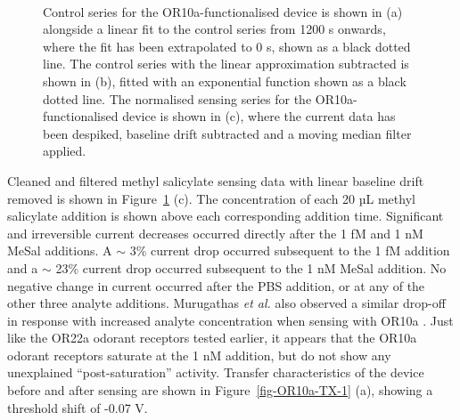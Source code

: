 \documentclass[
  a4paper,
]{scrbook}
\begin{document}
\begin{figure}
\begin{minipage}[t]{0.70\linewidth}
{{}

}

\end{minipage}%
%
\begin{minipage}[t]{0.15\linewidth}

{\centering 

~

}

\end{minipage}%

\caption[Control series for the OR10a-functionalised device alongside a
linear fitted curve, the control series with linear fit subtracted and
fitted with an exponential curve, and the normalised and filtered
sensing series for the OR10a-functionalised
device.]{\label{fig-OR10a-sensing}Control series for the
OR10a-functionalised device is shown in (a) alongside a linear fit to
the control series from 1200 s onwards, where the fit has been
extrapolated to 0 s, shown as a black dotted line. The control series
with the linear approximation subtracted is shown in (b), fitted with an
exponential function shown as a black dotted line. The normalised
sensing series for the OR10a-functionalised device is shown in (c),
where the current data has been despiked, baseline drift subtracted and
a moving median filter applied.}

\end{figure}

Cleaned and filtered methyl salicylate sensing data with linear baseline
drift removed is shown in Figure~\ref{fig-OR10a-sensing} (c). The
concentration of each 20 µL methyl salicylate addition is shown above
each corresponding addition time. Significant and irreversible current
decreases occurred directly after the 1 fM and 1 nM MeSal additions. A
\(\sim\) 3\% current drop occurred subsequent to the 1 fM addition and a
\(\sim\) 23\% current drop occurred subsequent to the 1 nM MeSal
addition. No negative change in current occurred after the PBS addition,
or at any of the other three analyte additions. Murugathas \emph{et al.}
also observed a similar drop-off in response with increased analyte
concentration when sensing with OR10a \autocite{Murugathas2019a}. Just
like the OR22a odorant receptors tested earlier, it appears that the
OR10a odorant receptors saturate at the 1 nM addition, but do not show
any unexplained ``post-saturation'' activity. Transfer characteristics
of the device before and after sensing are shown in
Figure~\ref{fig-OR10a-TX-1} (a), showing a threshold shift of -0.07 V.
\end{document}
